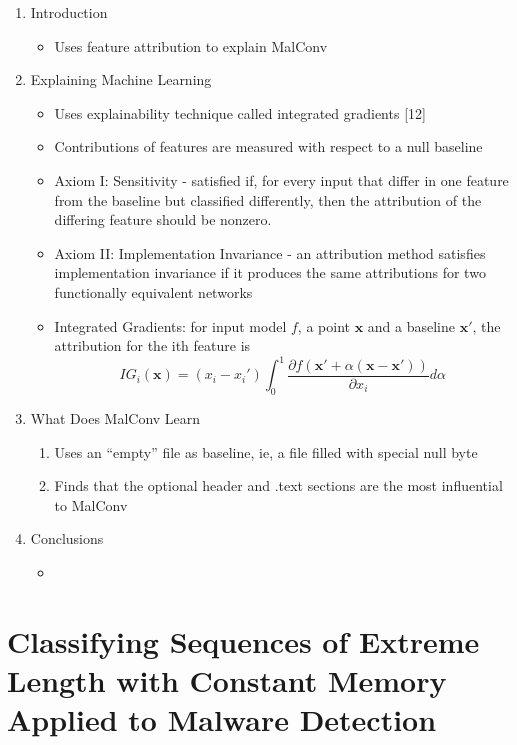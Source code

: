 \documentclass{article}
\begin{document}
\begin{enumerate}
	\item Introduction
	\begin{itemize}
		\item Uses feature attribution to explain MalConv
	\end{itemize}
	\item Explaining Machine Learning
	\begin{itemize}
		\item Uses explainability technique called integrated gradients [12]
		\item Contributions of features are measured with respect to a null baseline
		\item Axiom I: Sensitivity - satisfied if, for every input that differ in one feature from the baseline but classified differently, then the attribution of the differing feature should be nonzero.
		\item Axiom II: Implementation Invariance - an attribution
		method satisfies implementation invariance if it produces the same attributions
		for two functionally equivalent networks
		\item Integrated Gradients: for input model $f$, a point $\boldsymbol{x}$ and a baseline $\boldsymbol{x'}$, the attribution for the ith feature is
		$$IG_i(\boldsymbol{x}) = (x_i - x_i') \int_0^1 \frac{\partial f(\boldsymbol{x'} + \alpha(\boldsymbol{x} - \boldsymbol{x'}))}{\partial x_i} d\alpha$$
	\end{itemize}
	\item What Does MalConv Learn
	\begin{enumerate}
		\item Uses an ``empty'' file as baseline, ie, a file filled with special null byte
		\item Finds that the optional header and .text sections are the most influential to MalConv
	\end{enumerate}
	\item Conclusions
	\begin{itemize}
		\item 
	\end{itemize}
\end{enumerate}

\pagebreak


\section*{Classifying Sequences of Extreme Length with Constant Memory Applied to Malware Detection}
\end{document}
